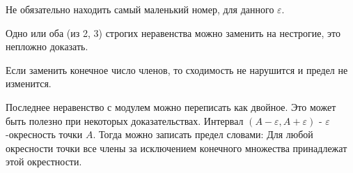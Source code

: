 \documentclass[12pt, a4paper]{article}
\begin{document}
    \begin{note}
      Не обязательно находить самый маленький номер, для данного $\varepsilon$.
    \end{note}
    
    \begin{note}
      Одно или оба (из 2, 3) строгих неравенства можно заменить на нестрогие, это непложно доказать.
    \end{note}
    
    \begin{note}
      Если заменить конечное число членов, то сходимость не нарушится и предел не изменится.
    \end{note}

    \begin{note}
      Последнее неравенство с модулем можно переписать как двойное. Это может быть полезно при некоторых доказательствах.
      Интервал $(A - \varepsilon, A + \varepsilon)$ - $\varepsilon$-окресность точки $A$.
      Тогда можно записать предел словами:
      Для любой окресности точки все члены за исключением конечного множества принадлежат этой окрестности.
    \end{note}
\end{document}
